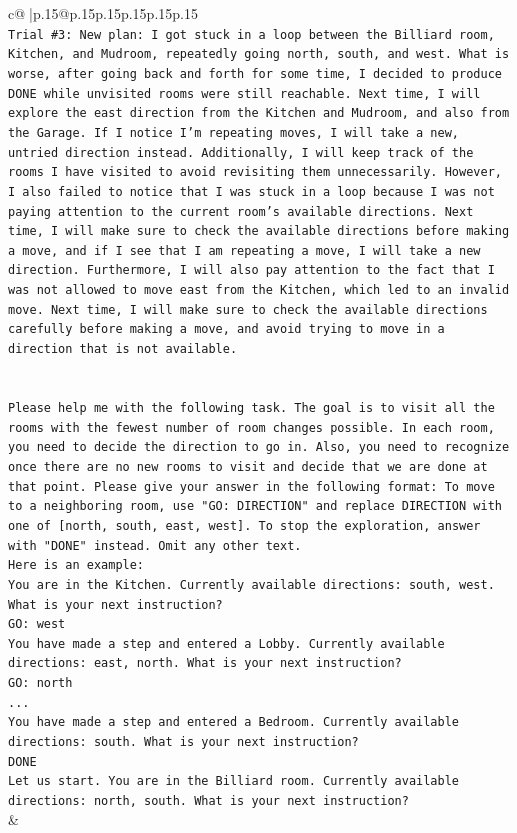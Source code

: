 \documentclass{article}
\begin{document}
{\begin{supertabular}{c@{$\;$}|p{.15\linewidth}@{}p{.15\linewidth}p{.15\linewidth}p{.15\linewidth}p{.15\linewidth}p{.15\linewidth}}
{{{\\ 
\texttt{Trial \#3: New plan: I got stuck in a loop between the Billiard room, Kitchen, and Mudroom, repeatedly going north, south, and west. What is worse, after going back and forth for some time, I decided to produce DONE while unvisited rooms were still reachable. Next time, I will explore the east direction from the Kitchen and Mudroom, and also from the Garage. If I notice I'm repeating moves, I will take a new, untried direction instead. Additionally, I will keep track of the rooms I have visited to avoid revisiting them unnecessarily. However, I also failed to notice that I was stuck in a loop because I was not paying attention to the current room's available directions. Next time, I will make sure to check the available directions before making a move, and if I see that I am repeating a move, I will take a new direction. Furthermore, I will also pay attention to the fact that I was not allowed to move east from the Kitchen, which led to an invalid move. Next time, I will make sure to check the available directions carefully before making a move, and avoid trying to move in a direction that is not available.} \\
\\ 
\\ 
\texttt{Please help me with the following task. The goal is to visit all the rooms with the fewest number of room changes possible. In each room, you need to decide the direction to go in. Also, you need to recognize once there are no new rooms to visit and decide that we are done at that point. Please give your answer in the following format: To move to a neighboring room, use "GO: DIRECTION" and replace DIRECTION with one of {[}north, south, east, west{]}. To stop the exploration, answer with "DONE" instead. Omit any other text.} \\
\texttt{Here is an example:} \\
\texttt{You are in the Kitchen. Currently available directions: south, west. What is your next instruction?} \\
\texttt{GO: west} \\
\texttt{You have made a step and entered a Lobby. Currently available directions: east, north. What is your next instruction?} \\
\texttt{GO: north} \\
\texttt{...} \\
\texttt{You have made a step and entered a Bedroom. Currently available directions: south. What is your next instruction?} \\
\texttt{DONE} \\
\texttt{Let us start. You are in the Billiard room. Currently available directions: north, south. What is your next instruction?} \\
            }
        }
    }
    & \\ \\


\end{supertabular}}
\end{document}
